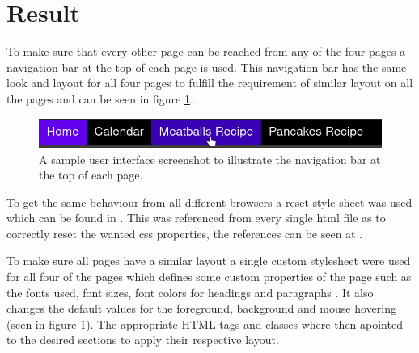 \documentclass[a4paper]{scrartcl}
\begin{document}


\section{Result}

To make sure that every other page can be reached from any of the four pages a navigation bar at the top of each page is used. This navigation bar has the same look and layout for all four pages to fulfill the requirement of similar layout on all the pages and can be seen in figure \ref{fig:navbar}.

\begin{figure}[h!]
    \begin{center}
        \includegraphics[scale=0.5]{images/navbar.png}
        \caption{A sample user interface screenshot to illustrate the navigation bar at the top of each page.}
        \label{fig:navbar}
    \end{center}
\end{figure}

To get the same behaviour from all different browsers a reset style sheet was used which can be found in \citet{kimblad_git_2018}. This was referenced from every single html file as to correctly reset the wanted css properties, the references can be seen at \citet{kimblad_git_2018-reset}.

To make sure all pages have a similar layout a single custom stylesheet were used for all four of the pages which defines some custom properties of the page such as the fonts used, font sizes, font colors for headings \citet{kimblad_git_2018-h1}\citet{kimblad_git_2018-h2} and paragraphs \citet{kimblad_git_2018-paragraph}. It also changes the default values for the foreground, background\citet{kimblad_git_2018-background} and mouse hovering (seen in figure \ref{fig:navbar}). The appropriate HTML tags and classes where then apointed to the desired sections to apply their respective layout.
\end{document}
